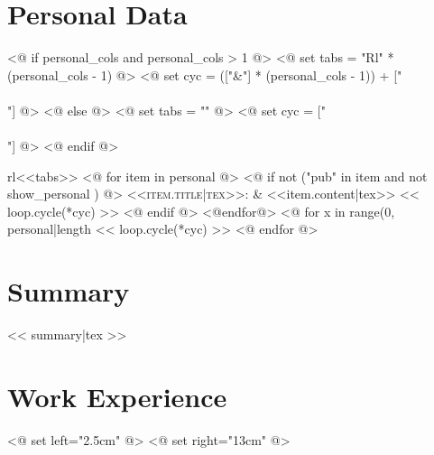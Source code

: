 \documentclass[letter,11pt]{article}
\begin{document}
\pagestyle{empty} %

\par{\bigskip\par}

\section*{Personal Data}

<@ if personal_cols and personal_cols > 1 @>
    <@ set tabs = "Rl" * (personal_cols - 1) @>
    <@ set cyc = (["&"] * (personal_cols - 1)) + ["\\\\"] @>
<@ else @>
    <@ set tabs = "" @>
    <@ set cyc = ["\\\\"] @>
<@ endif @>

\begin{tabularx}{\textwidth}{rl<<tabs>>}
<@ for item in  personal @>
    <@ if not ("pub" in item and not show_personal ) @>
    \textsc{<<item.title|tex>>:} & <<item.content|tex>> << loop.cycle(*cyc) >>
    <@ endif @>
<@endfor@>
<@ for x in range(0, personal|length %
    << loop.cycle(*cyc) >>
<@ endfor @>
\end{tabularx}

\section*{Summary}
<< summary|tex >>

\section*{Work Experience}

<@ set left="2.5cm" @>
<@ set right="13cm" @>

\setlength\LTleft{0cm}
\end{document}
